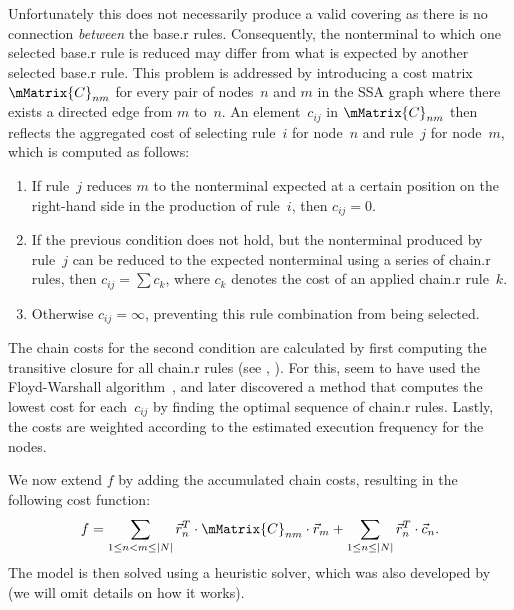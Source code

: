Unfortunately this does not necessarily produce a valid covering as there is no
connection \emph{between} the \gls{base.r} \glspl{rule}.
%
Consequently, the \gls{nonterminal} to which one selected \gls{base.r}
\gls{rule} is reduced may differ from what is expected by another selected
\gls{base.r} \gls{rule}.
%
This problem is addressed by introducing a cost matrix~$\mMatrix{C}_{nm}$ for
every pair of \glspl{node}~$n$ and $m$ in the \gls{SSA graph} where there exists
a directed \gls{edge} from $m$ to~$n$.
%
An element~$c_{ij}$ in $\mMatrix{C}_{nm}$ then reflects the aggregated cost of
selecting rule~$i$ for \gls{node}~$n$ and rule~$j$ for \gls{node}~$m$, which is
computed as follows:
%
\begin{enumerate}
  \item If rule~$j$ reduces $m$ to the \gls{nonterminal} expected at a certain
    position on the right-hand side in the \gls{production} of rule~$i$, then
    \mbox{$c_{ij} = 0$}.
  \item If the previous condition does not hold, but the \gls{nonterminal}
    produced by rule~$j$ can be reduced to the expected \gls{nonterminal} using
    a series of \gls{chain.r} \glspl{rule}, then \mbox{$c_{ij} = \sum c_k$},
    where $c_k$ denotes the cost of an applied \gls{chain.r} \gls{rule}~$k$.
  \item Otherwise \mbox{$c_{ij} = \infty$}, preventing this rule combination
    from being selected.
\end{enumerate}
%
The chain costs for the second condition are calculated by first computing the
\gls{transitive closure} for all \gls{chain.r} \glspl{rule} (see
, ).
%
For this, \citeauthor{EcksteinEtAl:2003} seem to have used the Floyd-Warshall
algorithm~\cite{Floyd:1962}, and \textcite{SchaeferScholz:2007} later discovered
a method that computes the lowest cost for each~$c_{ij}$ by finding the optimal
sequence of \gls{chain.r} \glspl{rule}.
%
Lastly, the costs are weighted according to the estimated execution frequency
for the \glspl{node}.

We now extend $f$ by adding the accumulated chain costs, resulting in the
following cost function:
%
\begin{displaymath}
  f =
  \sum_{1 \leq n < m \leq |N|}
    \mVector{r}_n^T \cdot \mMatrix{C}_{nm} \cdot \mVector{r}_m
  +
  \sum_{1 \leq n \leq |N|} \mVector{r}_n^T \cdot \mVector{c}_n.
\end{displaymath}
%
The model is then solved using a heuristic  solver, which was
also developed by \citeauthor{EcksteinEtAl:2003} (we will omit details on how it
works).

